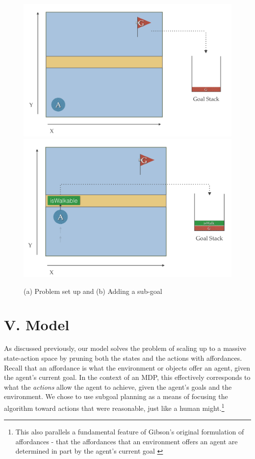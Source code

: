 \documentclass[a4paper]{article}
\begin{document}
\begin{figure}[t!]
	\centering
	\includegraphics[scale=0.2]{images/problem.png}
	\hspace{19pt}
	\includegraphics[scale=0.2]{images/isWalk.png}
	\caption{(a) Problem set up and (b) Adding a sub-goal}
	\label{fig:bridgeworld}
\end{figure}

\section{V. Model}

As discussed previously, our model solves the problem of scaling up to a massive state-action space by pruning both the states and the actions with affordances. Recall that an affordance is what the environment or objects offer an agent, given the agent's current goal. In the context of an MDP, this effectively corresponds to what the {\it actions} allow the agent to achieve, given the agent's goals and the environment. We chose to use subgoal planning as a means of focusing the algorithm toward actions that were reasonable, just like a human might.\footnote{This also parallels a fundamental feature of Gibson's original formulation of affordances - that the affordances that an environment offers an agent are determined in part by the agent's current goal \cite{Gibson}}
\end{document}
